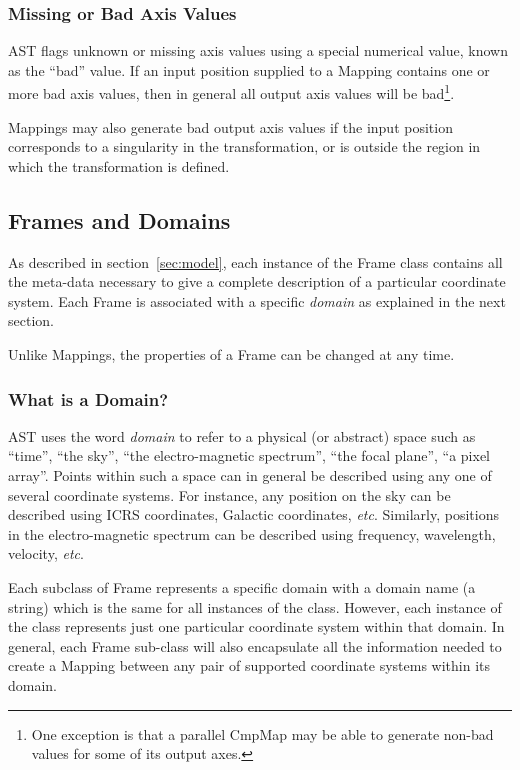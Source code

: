 \documentclass[final,authoryear,5p,times,twocolumn]{elsarticle}
\begin{document}
\subsubsection{Missing or Bad Axis Values}
\label{sec:bad}
AST flags unknown or missing axis values using a special numerical value,
known as the ``bad'' value. If an input position supplied to a Mapping
contains one or more bad axis values, then in general all output axis
values will be bad\footnote{One exception is that a parallel CmpMap may
be able to generate non-bad values for some of its output axes.}.

Mappings may also generate bad output axis values if the input position
corresponds to a singularity in the transformation, or is outside the
region in which the transformation is defined.

\subsection{Frames and Domains}
As described in section~\ref{sec:model}, each instance of the Frame class
contains all the meta-data necessary to give a complete description of
a particular coordinate system. Each Frame is associated with a specific
\emph{domain} as explained in the next section.

Unlike Mappings, the properties of a Frame can be changed at any time.

\subsubsection{What is a Domain?}
\label{sec:domain}
AST uses the word \emph{domain} to refer to a physical (or abstract)
space such as ``time'', ``the sky'', ``the electro-magnetic spectrum'',
``the focal plane'', ``a pixel array''. Points within such a space can in
general be described using any one of several coordinate systems. For
instance, any position on the sky can be described using ICRS
coordinates, Galactic coordinates, \emph{etc}. Similarly, positions in
the electro-magnetic spectrum can be described using frequency,
wavelength, velocity, \emph{etc}.

Each subclass of Frame represents a specific domain with a domain name (a
string) which is the same for all instances of the class. However, each
instance of the class represents just one particular coordinate system
within that domain. In general, each Frame sub-class will also
encapsulate all the information needed to create a Mapping between any
pair of supported coordinate systems within its domain.
\end{document}
